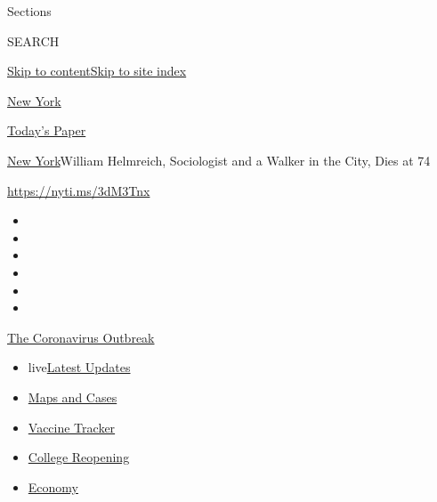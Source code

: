 Sections

SEARCH

\protect\hyperlink{site-content}{Skip to
content}\protect\hyperlink{site-index}{Skip to site index}

\href{https://www.nytimes.com/section/nyregion}{New York}

\href{https://myaccount.nytimes.com/auth/login?response_type=cookie\&client_id=vi}{}

\href{https://www.nytimes.com/section/todayspaper}{Today's Paper}

\href{/section/nyregion}{New York}\textbar{}William Helmreich,
Sociologist and a Walker in the City, Dies at 74

\url{https://nyti.ms/3dM3Tnx}

\begin{itemize}
\item
\item
\item
\item
\item
\item
\end{itemize}

\href{https://www.nytimes.com/news-event/coronavirus?action=click\&pgtype=Article\&state=default\&region=TOP_BANNER\&context=storylines_menu}{The
Coronavirus Outbreak}

\begin{itemize}
\tightlist
\item
  live\href{https://www.nytimes.com/2020/08/03/world/coronavirus-covid-19.html?action=click\&pgtype=Article\&state=default\&region=TOP_BANNER\&context=storylines_menu}{Latest
  Updates}
\item
  \href{https://www.nytimes.com/interactive/2020/us/coronavirus-us-cases.html?action=click\&pgtype=Article\&state=default\&region=TOP_BANNER\&context=storylines_menu}{Maps
  and Cases}
\item
  \href{https://www.nytimes.com/interactive/2020/science/coronavirus-vaccine-tracker.html?action=click\&pgtype=Article\&state=default\&region=TOP_BANNER\&context=storylines_menu}{Vaccine
  Tracker}
\item
  \href{https://www.nytimes.com/2020/08/02/us/covid-college-reopening.html?action=click\&pgtype=Article\&state=default\&region=TOP_BANNER\&context=storylines_menu}{College
  Reopening}
\item
  \href{https://www.nytimes.com/live/2020/08/03/business/stock-market-today-coronavirus?action=click\&pgtype=Article\&state=default\&region=TOP_BANNER\&context=storylines_menu}{Economy}
\end{itemize}

